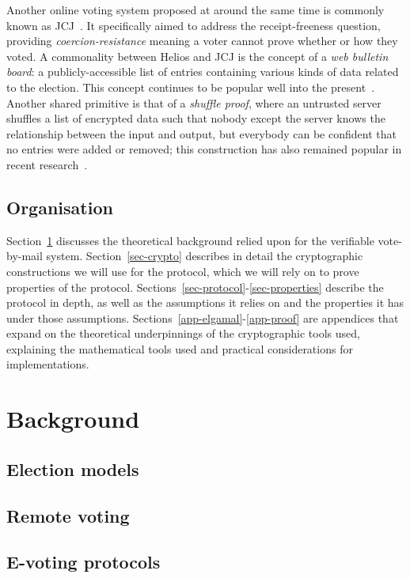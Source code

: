 \documentclass[12pt,a4paper]{article}
\theoremstyle{definition}
\begin{document}
Another online voting system proposed at around the same time is commonly known as JCJ~\cite{juels2010coercion}. It specifically aimed to address the receipt-freeness question, providing \textit{coercion-resistance} meaning a voter cannot prove whether or how they voted. A commonality between Helios and JCJ is the concept of a \textit{web bulletin board}: a publicly-accessible list of entries containing various kinds of data related to the election. This concept continues to be popular well into the present~\cite{kiayias2018security}. Another shared primitive is that of a \textit{shuffle proof}, where an untrusted server shuffles a list of encrypted data such that nobody except the server knows the relationship between the input and output, but everybody can be confident that no entries were added or removed; this construction has also remained popular in recent research~\cite{cortier2017machine}.

\subsection{Organisation}
Section~\ref{sec-background} discusses the theoretical background relied upon for the verifiable vote-by-mail system. Section~\ref{sec-crypto} describes in detail the cryptographic constructions we will use for the protocol, which we will rely on to prove properties of the protocol. Sections~\ref{sec-protocol}-\ref{sec-properties} describe the protocol in depth, as well as the assumptions it relies on and the properties it has under those assumptions. Sections~\ref{app-elgamal}-\ref{app-proof}  are appendices that expand on the theoretical underpinnings of the cryptographic tools used, explaining the mathematical tools used and practical considerations for implementations.

\section{Background}\label{sec-background}
\subsection{Election models}
\subsection{Remote voting}
\subsection{E-voting protocols}
\end{document}
